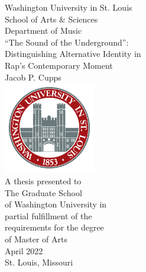 \begin{titlepage}
    \begin{center}
        \small Washington University in St. Louis \\
                   School of Arts \& Sciences \\
                       Department of Music \\
        \vspace*{1.25in}
        \Large   ``The Sound of the Underground'': \\
        \vspace{0.1cm}
        \large   Distinguishing Alternative Identity in \\ 
                      Rap's Contemporary Moment  \\
        \vspace{0.5cm}
        \normalsize      Jacob P. Cupps \\
        \vfill
        \includegraphics[width=0.3\textwidth]{images/misc/header_logo.png} \\
        \vspace{0.8cm}
        \small A thesis presented to \\ 
                The Graduate School \\ 
             of Washington University in \\ 
             partial fulfillment of the \\ 
             requirements for the degree \\ 
                 of Master of Arts \\
        \vspace{0.8cm}
        \normalsize April 2022 \\
        St. Louis, Missouri
    \end{center}
\end{titlepage}